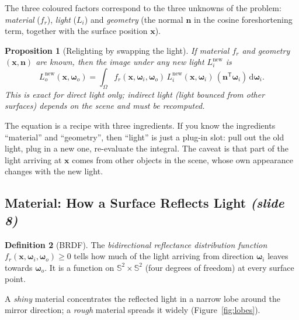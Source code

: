 \documentclass[11pt,a4paper]{article}
\theoremstyle{definition}
\newtheorem{definition}{Definition}[section]
\theoremstyle{plain}
\newtheorem{proposition}[definition]{Proposition}
\theoremstyle{remark}
\newcommand{\slideone}[1]{\texorpdfstring{\emph{(slide #1)}}{(slide #1)}}
\newcommand{\Sph}{\mathbb{S}^2}
\newcommand{\x}{{\bm{x}}}
\newcommand{\n}{{\bm{n}}}
\newcommand{\wi}{{\bm{\omega}_i}}
\newcommand{\wo}{{\bm{\omega}_o}}
\newcommand{\fr}{f_r}
\newcommand{\Lo}{L_o}
\newcommand{\Li}{L_i}
\begin{document}
The three coloured factors correspond to the three unknowns of the problem: \emph{material} ($\fr$), \emph{light} ($\Li$) and \emph{geometry} (the normal $\n$ in the cosine foreshortening term, together with the surface position $\x$).

\begin{proposition}[Relighting by swapping the light]\label{prop:swap}
If material $\fr$ and geometry $(\x,\n)$ are known, then the image under any new light $\Li^{\mathrm{new}}$ is
\[
 \Lo^{\mathrm{new}}(\x,\wo)=\int_{\Omega}\fr(\x,\wi,\wo)\,\Li^{\mathrm{new}}(\x,\wi)\,(\n^{\mathsf T}\wi)\,\mathrm d\wi .
\]
This is exact for \emph{direct} light only; indirect light (light bounced from other surfaces) depends on the scene and must be recomputed.
\end{proposition}

\begin{intuition}
The equation is a recipe with three ingredients. If you know the ingredients ``material'' and ``geometry'', then ``light'' is just a plug-in slot: pull out the old light, plug in a new one, re-evaluate the integral. The caveat is that part of the light arriving at $\x$ comes from other objects in the scene, whose own appearance changes with the new light.
\end{intuition}

\subsection{Material: How a Surface Reflects Light \slideone{8}}

\begin{definition}[BRDF]
The \emph{bidirectional reflectance distribution function} $\fr(\x,\wi,\wo)\ge 0$ tells how much of the light arriving from direction $\wi$ leaves towards $\wo$. It is a function on $\Sph\times\Sph$ (four degrees of freedom) at every surface point.
\end{definition}

A \emph{shiny} material concentrates the reflected light in a narrow lobe around the mirror direction; a \emph{rough} material spreads it widely (Figure~\ref{fig:lobes}).
\end{document}
